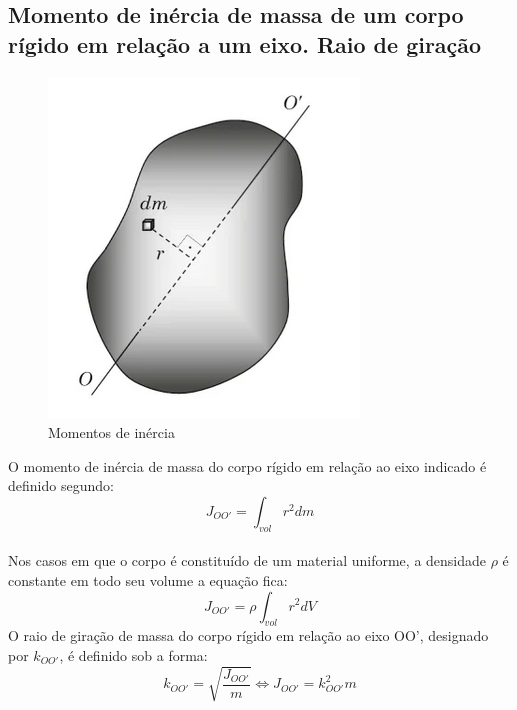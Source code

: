\documentclass[a4paper, 12pt]{article}
\begin{document}
	\subsection{Momento de inércia de massa de um corpo rígido em relação a um eixo. Raio de giração}
		\begin{figure}[h]
			\center
			\includegraphics[scale=0.5]{imagens/a1.png} 
			\caption{Momentos de inércia}
		\end{figure}	
		O momento de inércia de massa do corpo rígido em relação ao eixo indicado é definido segundo:	
		\begin{equation}
			J_{OO'} = \int_{vol}r^2dm
		\end{equation}\\
		Nos casos em que o corpo é constituído de um material uniforme, a densidade $\rho$ é constante em todo seu volume a equação fica:
		\begin{equation}
			J_{OO'} = \rho \int_{vol}r^2dV
		\end{equation}
		O raio de giração de massa do corpo rígido em relação ao eixo OO', designado por $k_{OO'}$, é definido sob a forma:
		\begin{equation}
			k_{OO'} = \sqrt{\frac{J_{OO'}}{m}} \Leftrightarrow J_{OO'} = k^2_{OO'}m
		\end{equation}
	\newpage
\end{document}
